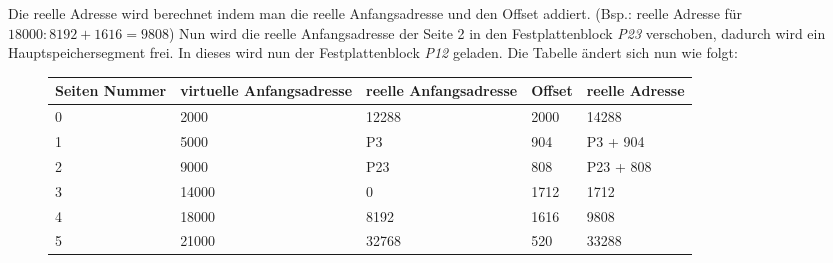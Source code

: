 \documentclass[12pt,a4paper]{article}
\begin{document}
    Die reelle Adresse wird berechnet indem man die reelle Anfangsadresse und den Offset \newline addiert. (Bsp.: reelle Adresse für $18000: 8192+1616=9808$)
    \newline
    \newline
    Nun wird die reelle Anfangsadresse der Seite 2 in den Festplattenblock \textit{P23} verschoben, dadurch wird ein Hauptspeichersegment frei. In dieses wird nun der Festplattenblock \textit{P12} geladen. Die Tabelle ändert sich nun wie folgt:
    \begin{figure}[h]
        \begin{tabularx}{17cm}{| X | X | X | X | X |}
            \hline 
            \small{Seiten Nummer} & \small{virtuelle Anfangsadresse} & \small{reelle Anfangsadresse} & \small{Offset} & 			\small{reelle Adresse} \\
            \hline
            0 & 2000 & 12288 & 2000 & 14288 \\
            \hline
            1 & 5000 & P3 & 904 & P3 + 904 \\
            \hline
            2 & 9000 & P23 & 808 & P23 + 808 \\
            \hline
            3 & 14000 & 0 & 1712 & 1712 \\
            \hline
            4 & 18000 & 8192 & 1616 & 9808 \\
            \hline
            5 & 21000 & 32768 & 520 & 33288 \\
            \hline
        \end{tabularx}
    \end{figure}
\end{document}

